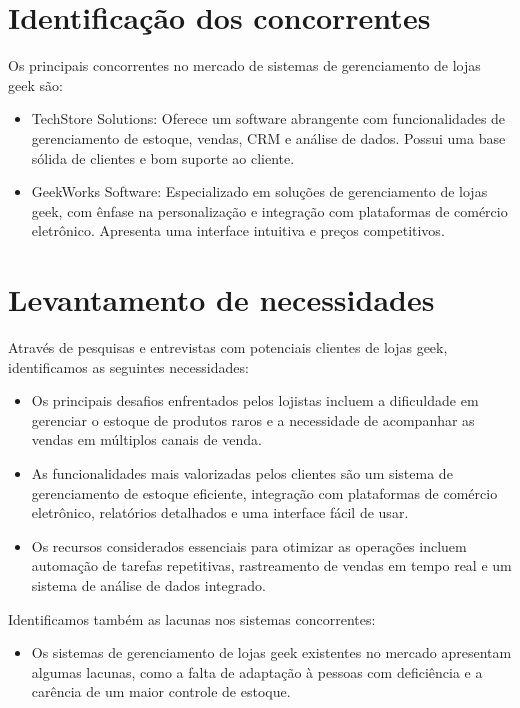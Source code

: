 \documentclass[
	12pt,				%
	openright,			%
	twoside,			%
	a4paper,			%
	english,			%
	brazil				%
	]{abntex2}
\begin{document}
\section{Identificação dos concorrentes}\label{ident_concorr}

Os principais concorrentes no mercado de sistemas de gerenciamento de lojas geek são:
\begin{itemize}
	\item	TechStore Solutions: Oferece um software abrangente com funcionalidades de gerenciamento de estoque, vendas, CRM e análise de dados. Possui uma base sólida de clientes e bom suporte ao cliente.
	\item	GeekWorks Software: Especializado em soluções de gerenciamento de lojas geek, com ênfase na personalização e integração com plataformas de comércio eletrônico. Apresenta uma interface intuitiva e preços competitivos.
\end{itemize}

\section{Levantamento de necessidades}\label{lev_necessidades}

Através de pesquisas e entrevistas com potenciais clientes de lojas geek, identificamos as seguintes necessidades:

\begin{itemize}
	\item	Os principais desafios enfrentados pelos lojistas incluem a dificuldade em gerenciar o estoque de produtos raros e a necessidade de acompanhar as vendas em múltiplos canais de venda.
	\item	As funcionalidades mais valorizadas pelos clientes são um sistema de gerenciamento de estoque eficiente, integração com plataformas de comércio eletrônico, relatórios detalhados e uma interface fácil de usar.
	\item	Os recursos considerados essenciais para otimizar as operações incluem automação de tarefas repetitivas, rastreamento de vendas em tempo real e um sistema de análise de dados integrado.
\end{itemize}

Identificamos também as lacunas nos sistemas concorrentes:

\begin{itemize}
	\item	Os sistemas de gerenciamento de lojas geek existentes no mercado apresentam algumas lacunas, como a falta de adaptação à pessoas com deficiência e a carência de um maior controle de estoque.
\end{itemize}
\end{document}
